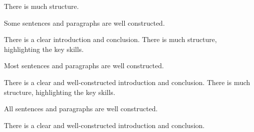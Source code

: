 \documentclass{../fal_assignment}
\begin{document}
\begin{markingrubric}
        \grade 		There is much structure.
        \par 		Some sentences and paragraphs are well constructed.
        \par 		There is a clear introduction and conclusion.
        \grade 		There is much structure, highlighting the key skills.
        \par 		Most sentences and paragraphs are well constructed.
        \par 		There is a clear and well-constructed introduction and conclusion.
        \grade 		There is much structure, highlighting the key skills.
        \par 		All sentences and paragraphs are well constructed.
        \par 		There is a clear and well-constructed introduction and conclusion.
\end{markingrubric}
\end{document}
